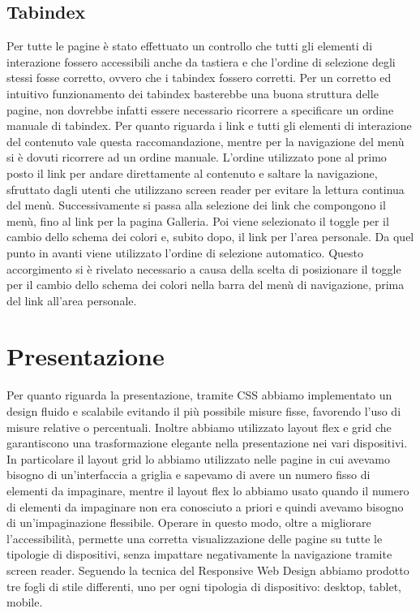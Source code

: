 \documentclass[a4paper]{article}
\begin{document}
	\subsection{Tabindex}
	Per tutte le pagine è stato effettuato un controllo che tutti gli elementi di interazione fossero accessibili anche da tastiera e che l'ordine di selezione degli stessi fosse corretto, ovvero che i tabindex fossero corretti. Per un corretto ed intuitivo funzionamento dei tabindex basterebbe una buona struttura delle pagine, non dovrebbe infatti essere necessario ricorrere a specificare un ordine manuale di tabindex. Per quanto riguarda i link e tutti gli elementi di interazione del contenuto vale questa raccomandazione, mentre per la navigazione del menù si è dovuti ricorrere ad un ordine manuale. L'ordine utilizzato pone al primo posto il link per andare direttamente al contenuto e saltare la navigazione, sfruttato dagli utenti che utilizzano screen reader per evitare la lettura continua del menù. Successivamente si passa alla selezione dei link che compongono il menù, fino al link per la pagina Galleria. Poi viene selezionato il toggle per il cambio dello schema dei colori e, subito dopo, il link per l'area personale. Da quel punto in avanti viene utilizzato l'ordine di selezione automatico. Questo accorgimento si è rivelato necessario a causa della scelta di posizionare il toggle per il cambio dello schema dei colori nella barra del menù di navigazione, prima del link all'area personale.

	\section{Presentazione}
	Per quanto riguarda la presentazione, tramite CSS abbiamo implementato un design fluido e scalabile evitando il più possibile misure fisse, favorendo l'uso di misure relative o percentuali. Inoltre abbiamo utilizzato layout flex e grid che garantiscono una trasformazione elegante nella presentazione nei vari dispositivi. In particolare il layout grid lo abbiamo utilizzato nelle pagine in cui avevamo bisogno di un'interfaccia a griglia e sapevamo di avere un numero fisso di elementi da impaginare, mentre il layout flex lo abbiamo usato quando il numero di elementi da impaginare non era conosciuto a priori e quindi avevamo bisogno di un'impaginazione flessibile. Operare in questo modo, oltre a migliorare l'accessibilità, permette una corretta visualizzazione delle pagine su tutte le tipologie di dispositivi, senza impattare negativamente la navigazione tramite screen reader. Seguendo la tecnica del Responsive Web Design abbiamo prodotto tre fogli di stile differenti, uno per ogni tipologia di dispositivo: desktop, tablet, mobile.
\end{document}
